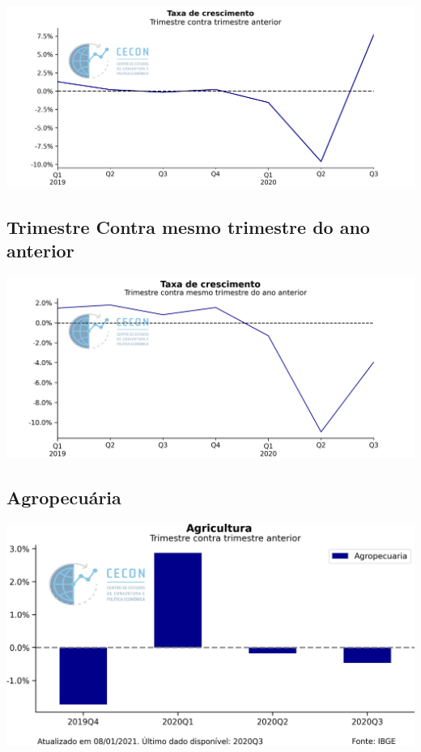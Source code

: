 \documentclass{SelfArx}
\begin{document}
\begin{center}
\includegraphics[width=.9\linewidth]{./figs/PIB/PIB.png}
\end{center}

\subsection*{Trimestre Contra mesmo trimestre do ano anterior}
\label{sec:org29844d6}

\begin{center}
\includegraphics[width=.9\linewidth]{./figs/PIB/PIB_YoY.png}
\end{center}

\subsection*{Agropecuária}
\label{sec:org9278b58}

\begin{center}
\includegraphics[width=.9\linewidth]{./figs/PIB/Agropecuaria.png}
\end{center}
\end{document}
